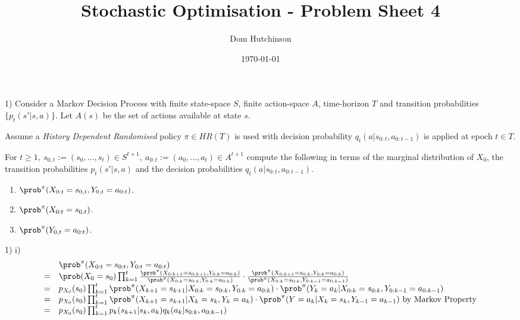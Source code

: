 \documentclass[11pt,a4paper]{article}
\begin{document}
\questionsfalse

\title{Stochastic Optimisation - Problem Sheet 4}
\author{Dom Hutchinson}
\date{\today}
\maketitle


\begin{question}{1)}
  Consider a Markov Decision Process with finite state-space $S$, finite action-space $A$, time-horizon $T$ and transition probabilities $\{p_t(s'|s,a)\}$. Let $A(s)$ be the set of actions available at state $s$.
  \par Assume a \textit{History Dependent Randomised} policy $\pi\in HR(T)$ is used with decision probability $q_t(a|s_{0:t},a_{0:t-1})$ is applied at epoch $t\in T$.
  \par For $t\geq1,\ s_{0,t}:=(s_0,\dots,s_t)\in S^{t+1},\ a_{0:t}:=(a_0,\dots,a_t)\in A^{t+1}$ compute the following in terms of the marginal distribution of $X_0$, the transition probabilities $p_t(s'|s,a)$ and the decision probabilities $q_t(a|s_{0:t},a_{0:t-1})$.
  \begin{enumerate}
    \item $\prob^\pi(X_{0:t}=s_{0,t},Y_{0,t}=a_{0:t})$.
    \item $\prob^\pi(X_{0:t}=s_{0,t})$.
    \item $\prob^\pi(Y_{0,t}=a_{0:t})$.
  \end{enumerate}
\end{question}

\begin{answer}{1) i)}
  \[\begin{array}{rl}
    &\prob^\pi(X_{0:t}=s_{0:t},Y_{0:t}=a_{0:t})\\
    =&\prob(X_0=s_0)\prod_{k=1}^t\frac{\prob^\pi(X_{0:k+1}=s_{0:k+1},Y_{0:k}=a_{0:k})}{\prob^\pi(X_{0:k}=s_{0:k},Y_{0:k}=a_{0:k})}\cdot\frac{\prob^\pi(X_{0:k+1}=s_{0:k},Y_{0:k}=a_{0:k})}{\prob^\pi(X_{0:k}=s_{0:k},Y_{0:k-1}=a_{0:k-1})}\\
    =&p_{X_0}(s_0)\prod_{k=1}^t\prob^\pi(X_{k+1}=s_{k+1}|X_{0:k}=s_{0:k},Y_{0:k}=a_{0:k})\cdot\prob^\pi(Y_k=a_k|X_{0:k}=s_{0:k},Y_{0:k-1}=a_{0:k-1})\\
    =&p_{X_0}(s_0)\prod_{k=1}^t\prob^\pi(X_{k+1}=s_{k+1}|X_k=s_k,Y_k=a_k)\cdot\prob^\pi(Y=a_k|X_k=s_k,Y_{k-1}=a_{k-1})\text{ by Markov Property}\\
    =&p_{X_0}(s_0)\prod_{k=1}^tp_k(s_{k+1}|s_k,a_k)q_k(a_k|s_{0:k},a_{0:k-1})
  \end{array}\]
\end{answer}
\end{document}
